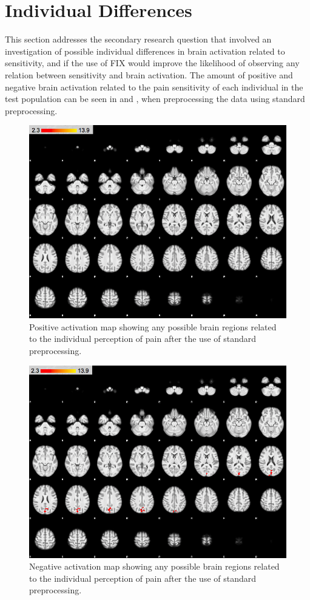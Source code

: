 \section{Individual Differences}

This section addresses the secondary research question that involved an investigation of possible individual differences in brain activation related to sensitivity, and if the use of FIX would improve the likelihood of observing any relation between sensitivity and brain activation. The amount of positive and negative brain activation related to the pain sensitivity of each individual in the test population can be seen in  and , when preprocessing the data using standard preprocessing.  

\begin{figure}[H]                 
	\includegraphics[width=.65\textwidth]{figures/Results/STD_pos_ID}  
	\caption{Positive activation map showing any possible brain regions related to the individual perception of pain after the use of standard preprocessing. }
	\label{STD_pos_ID} 
\end{figure}

\begin{figure}[H]                 
	\includegraphics[width=.65\textwidth]{figures/Results/STD_neg_ID}  
	\caption{Negative activation map showing any possible brain regions related to the individual perception of pain after the use of standard preprocessing.}
	\label{STD_neg_ID} 
\end{figure}
 
